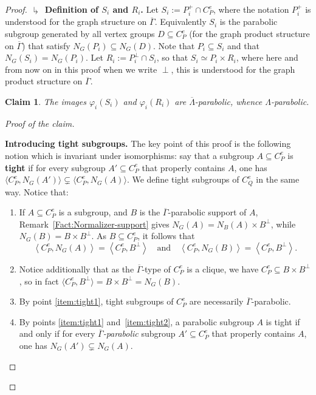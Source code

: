\documentclass[a4paper,english,11pt]{article}
\newtheorem{claim}[de]{Claim}
\theoremstyle{definition}
\theoremstyle{remark}
\newcommand{\deffont}[1]{\textbf{#1}}
\begin{document}
\begin{proof}
\textbf{$\drsh$ Definition of $S_i$ and $R_i$.} Let $S_i:=P_i^+\cap C_P^e$, where the notation $P_i^+$ is understood for the graph structure on $\overline{\Gamma}$. Equivalently $S_i$ is the parabolic subgroup generated by all vertex groups $D\subseteq C_P^e$ (for the graph product structure on $\overline{\Gamma}$) that satisfy $N_G(P_i)\subseteq N_G(D)$. Note that $P_i\subseteq S_i$ and that $N_G(S_i)=N_G(P_i)$. Let $R_i:=P_i^\perp\cap S_i$, so that $S_i\simeq P_i\times R_i$, where here and from now on in this proof when we write $\perp$, this is understood for the graph product structure on $\overline{\Gamma}$. 

\begin{claim}\label{claim:step-1}
The images $\varphi_i(S_i)$ and $\varphi_i(R_i)$ are $\overline{\Lambda}$-parabolic, whence $\Lambda$-parabolic.
\end{claim}


\begin{proof}[Proof of the claim]~

\textbf{Introducing tight subgroups.} The key point of this proof is the following notion which is invariant under isomorphisms: say that a subgroup $A\subseteq C_P^e$ is \deffont{tight} if for every subgroup $A'\subseteq C_P^e$ that properly contains $A$, one has $\langle C_P^e,N_G(A')\rangle\subsetneq \langle C_P^e,N_G(A)\rangle$. We define tight subgroups of $C_Q^e$ in the same way. Notice that:
\begin{enumerate}[label={(\alph*)}]
\item \label{item:tight1} If $A\subseteq C_P^e$ is a subgroup, and $B$ is the $\overline{\Gamma}$-parabolic support of $A$, Remark~\ref{Fact:Normalizer-support} gives $N_G(A)=N_B(A)\times B^\perp$, while $N_G(B)=B\times B^\perp$. As $B\subseteq C_P^e$, it follows that \begin{equation*}
    \left\langle C^e_P,N_G(A)\right\rangle
    =\left\langle C_P^e, B^\perp\right\rangle 
    \quad \text{and} \quad
    \left\langle C^e_P,N_G(B)\right\rangle
    =\left\langle C_P^e, B^\perp\right\rangle.
\end{equation*}
\item \label{item:tight2} Notice additionally that as the $\overline{\Gamma}$-type of $C_P^e$ is a clique, we have $C_P^e\subseteq B\times B^\perp$, so in fact $\langle C_P^e, B^\perp\rangle=B\times B^\perp=N_G(B)$.
\item \label{item:tight-parab} By point \ref{item:tight1}, tight subgroups of $C^e_P$ are necessarily $\overline{\Gamma}$-parabolic.
\item \label{item:tight-CNS} By points \ref{item:tight1} and~\ref{item:tight2}, a parabolic subgroup $A$ is tight if and only if for every \emph{$\mathit{\overline{\Gamma}}$-parabolic} subgroup $A'\subseteq C^e_P$ that properly contains $A$, one has $N_G(A')\subsetneq N_G(A)$.
\end{enumerate} 
\medskip


\end{proof}
\end{proof}
\end{document}
